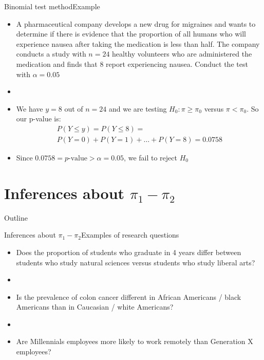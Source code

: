 \documentclass[xcolor=dvipsnames]{beamer}
\begin{document}
\begin{frame}{Binomial test method}{Example}
	\begin{itemize}
		\item A pharmaceutical company develops a new drug for migraines and wants to determine if there is evidence that the proportion of all humans who will experience nausea after taking the medication is less than half. The company conducts a study with $n = 24$ healthy volunteers who are administered the medication and finds that 8 report experiencing nausea. Conduct the test with $\alpha = 0.05$  \pause
		\item[]
		\item We have $y = 8$ out of $n = 24$ and we are testing $H_0: \pi \geq \pi_0$ versus $\pi < \pi_0$.  \pause So our p-value is:  \pause
		\begin{gather*}
			P(Y \leq y) = P(Y \leq 8) = \\
			 P(Y = 0) + P(Y = 1) + \hdots + P(Y = 8) =0.0758
		\end{gather*}  \pause
		\item Since $0.0758 = p\text{-value} > \alpha = 0.05$, we fail to reject $H_0$
	\end{itemize}
\end{frame}

\section{Inferences about $\pi_1 - \pi_2$}

\begin{frame}{Outline}
	\tableofcontents[currentsection,subsectionstyle=show/shaded/hide]
\end{frame}

\begin{frame}{Inferences about $\pi_1 - \pi_2$}{Examples of research questions}
	\begin{itemize}
		\item Does the proportion of students who graduate in 4 years differ between students who study natural sciences versus students who study liberal arts?  \pause
		\item[]
		\item Is the prevalence of colon cancer different in African Americans / black Americans than in Caucasian / white Americans?  \pause
		\item[]
		\item Are Millennials employees more likely to work remotely than Generation X employees?
	\end{itemize}
\end{frame}
\end{document}
